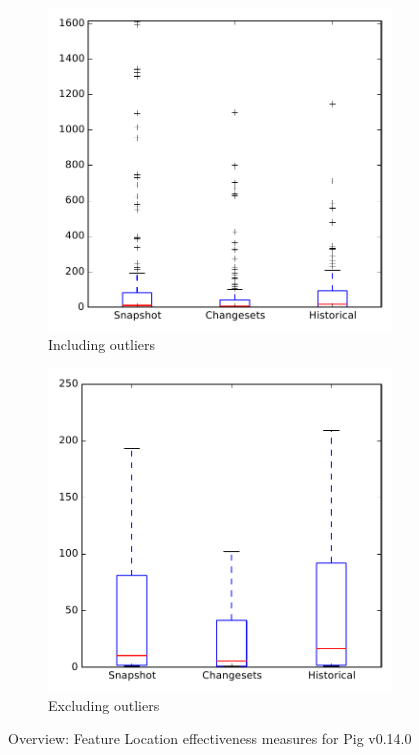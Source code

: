 
\begin{figure}
    \centering
    \begin{subfigure}{.4\textwidth}
        \centering
        \includegraphics[height=0.4\textheight]{figures/flt/all_pig}
        \caption{Including outliers}\label{fig:flt:all:pig_outlier}
    \end{subfigure}%
    \begin{subfigure}{.4\textwidth}
        \centering
        \includegraphics[height=0.4\textheight]{figures/flt/all_pig_no_outlier}
        \caption{Excluding outliers}\label{fig:flt:all:pig_no_outlier}
    \end{subfigure}
\caption{Overview: Feature Location effectiveness measures for Pig v0.14.0}
\label{fig:flt:all:pig}
\end{figure}
